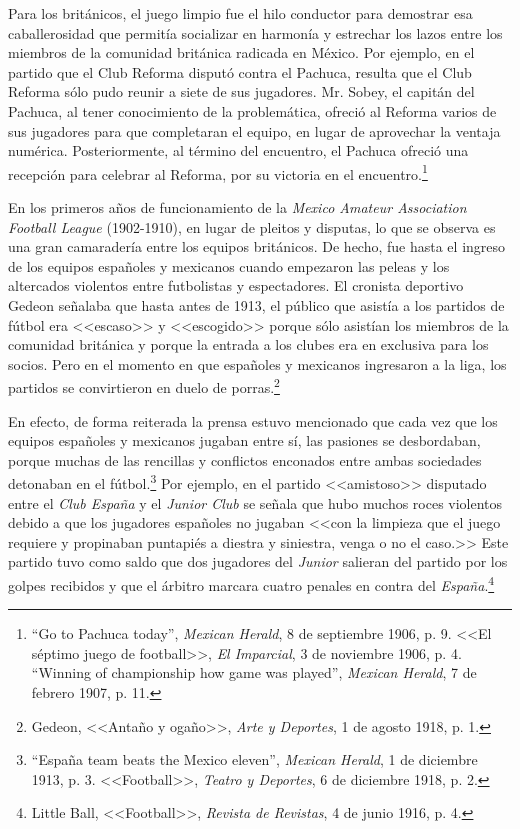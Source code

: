 \documentclass[11pt,a5paper,twoside]{book} %
\begin{document}
Para los británicos, el juego limpio fue el hilo conductor para demostrar esa caballerosidad que permitía socializar en harmonía y estrechar los lazos entre los miembros de la comunidad británica radicada en México. Por ejemplo, en el partido que el Club Reforma disputó contra el Pachuca, resulta que el Club Reforma sólo pudo reunir a siete de sus jugadores. Mr. Sobey, el capitán del Pachuca, al tener conocimiento de la problemática, ofreció al Reforma varios de sus jugadores para que completaran el equipo, en lugar de aprovechar la ventaja numérica. Posteriormente, al término del encuentro, el Pachuca ofreció una recepción para celebrar al Reforma, por su victoria en el encuentro.\footnote{``Go to Pachuca today'', \emph{Mexican Herald}, 8 de septiembre 1906, p. 9. <<El séptimo juego de football>>, \emph{El Imparcial}, 3 de noviembre 1906, p. 4. ``Winning of championship how game was played'', \emph{Mexican Herald}, 7 de febrero 1907, p. 11.}

En los primeros años de funcionamiento de la \emph{Mexico Amateur Association Football League} (1902-1910), en lugar de pleitos y disputas, lo que se observa es una gran camaradería entre los equipos británicos. De hecho, fue hasta el ingreso de los equipos españoles y mexicanos cuando empezaron las peleas y los altercados violentos entre futbolistas y espectadores. El cronista deportivo Gedeon señalaba que hasta antes de 1913, el público que asistía a los partidos de fútbol era <<escaso>> y <<escogido>> porque sólo asistían los miembros de la comunidad británica y porque la entrada a los clubes era en exclusiva para los socios. Pero en el momento en que españoles y mexicanos ingresaron a la liga, los partidos se convirtieron en duelo de porras.\footnote{Gedeon, <<Antaño y ogaño>>, \emph{Arte y Deportes}, 1 de agosto 1918, p. 1.}

En efecto, de forma reiterada la prensa estuvo mencionado que cada vez que los equipos españoles y mexicanos jugaban entre sí, las pasiones se desbordaban, porque muchas de las rencillas y conflictos enconados entre ambas sociedades detonaban en el fútbol.\footnote{``España team beats the Mexico eleven'', \emph{Mexican Herald}, 1 de diciembre 1913, p. 3. <<Football>>, \emph{Teatro y Deportes}, 6 de diciembre 1918, p. 2.} Por ejemplo, en el partido <<amistoso>> disputado entre el \emph{Club España} y el \emph{Junior Club} se señala que hubo muchos roces violentos debido a que los jugadores españoles no jugaban <<con la limpieza que el juego requiere y propinaban puntapiés a diestra y siniestra, venga o no el caso.>> Este partido tuvo como saldo que dos jugadores del \emph{Junior} salieran del partido por los golpes recibidos y que el árbitro marcara cuatro penales en contra del \emph{España}.\footnote{Little Ball, <<Football>>, \emph{Revista de Revistas}, 4 de junio 1916, p. 4.}
\end{document}

